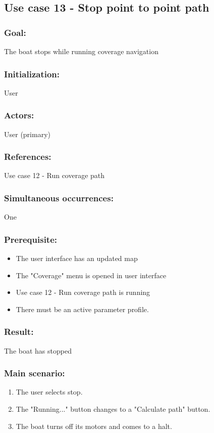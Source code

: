 \begin{framed}
	\subsection{Use case 13 - Stop point to point path}
	\subsubsection*{Goal:}
	The boat stops while running coverage navigation
	
	\subsubsection*{Initialization:}
	User
	
	\subsubsection*{Actors:}
	User (primary)
	
	\subsubsection*{References:}
	Use case 12 - Run coverage path
	
	\subsubsection*{Simultaneous occurrences:}
	One 
	
	\subsubsection*{Prerequisite:}
	\begin{itemize}
		\item The user interface has an updated map
		\item The "Coverage" menu is opened in user interface
		\item Use case 12 - Run coverage path is running
		\item There must be an active parameter profile.
		
	\end{itemize}
	
	\subsubsection*{Result:}
	The boat has stopped
	
	\subsubsection*{Main scenario:}
	\begin{enumerate}
		\item The user selects stop.
		\item The "Running..." button changes to a "Calculate path" button.
		\item The boat turns off its motors and comes to a halt.
	\end{enumerate}	
\end{framed}	








